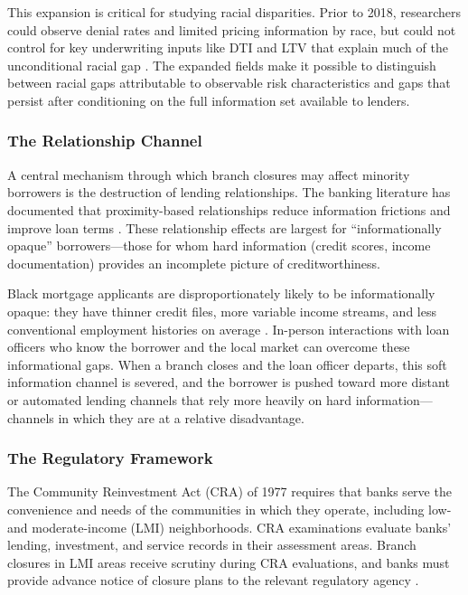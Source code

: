 \documentclass[12pt]{article}
\begin{document}
This expansion is critical for studying racial disparities. Prior to 2018, researchers could observe denial rates and limited pricing information by race, but could not control for key underwriting inputs like DTI and LTV that explain much of the unconditional racial gap \citep{avery2005, bhutta2020}. The expanded fields make it possible to distinguish between racial gaps attributable to observable risk characteristics and gaps that persist after conditioning on the full information set available to lenders.

\subsubsection*{The Relationship Channel} A central mechanism through which branch closures may affect minority borrowers is the destruction of lending relationships. The banking literature has documented that proximity-based relationships reduce information frictions and improve loan terms \citep{petersen2004, degryse2005, agarwal2010}. These relationship effects are largest for ``informationally opaque'' borrowers---those for whom hard information (credit scores, income documentation) provides an incomplete picture of creditworthiness.

Black mortgage applicants are disproportionately likely to be informationally opaque: they have thinner credit files, more variable income streams, and less conventional employment histories on average \citep{bayer2018}. In-person interactions with loan officers who know the borrower and the local market can overcome these informational gaps. When a branch closes and the loan officer departs, this soft information channel is severed, and the borrower is pushed toward more distant or automated lending channels that rely more heavily on hard information---channels in which they are at a relative disadvantage.

\subsubsection*{The Regulatory Framework} The Community Reinvestment Act (CRA) of 1977 requires that banks serve the convenience and needs of the communities in which they operate, including low- and moderate-income (LMI) neighborhoods. CRA examinations evaluate banks' lending, investment, and service records in their assessment areas. Branch closures in LMI areas receive scrutiny during CRA evaluations, and banks must provide advance notice of closure plans to the relevant regulatory agency \citep{ringo2023}.
\end{document}
